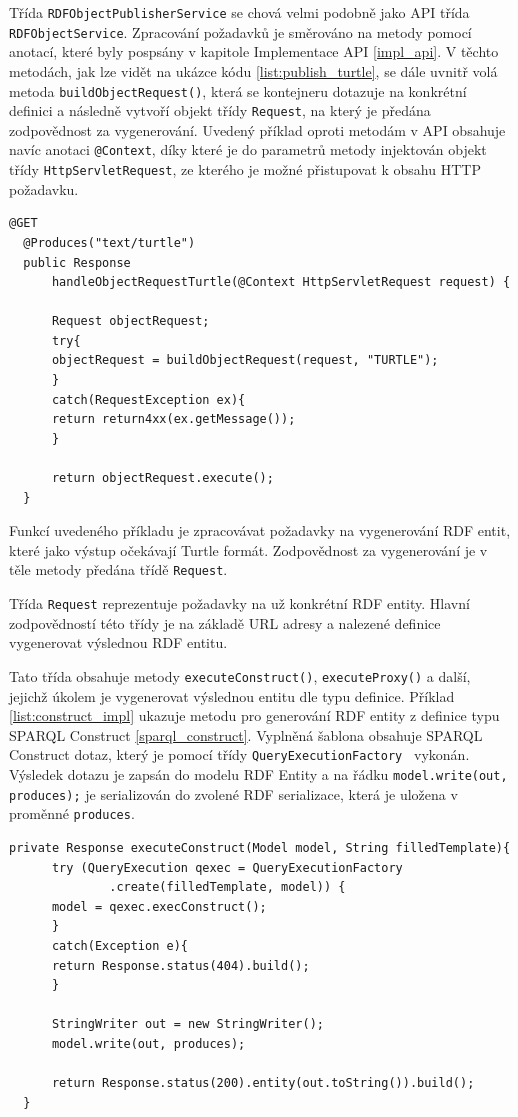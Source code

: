 \documentclass[thesis=B,czech]{FITthesis}[2012/06/26]
\begin{document}
  Třída \texttt{RDFObjectPublisherService} se chová velmi podobně jako API třída \texttt{RDFObjectService}.
  Zpracování požadavků je směrováno na metody pomocí anotací, které byly pospsány v kapitole Implementace API \ref{impl_api}.
  V těchto metodách, jak lze vidět na ukázce kódu \ref{list:publish_turtle}, se dále uvnitř volá metoda \texttt{buildObjectRequest()}, která se kontejneru dotazuje na konkrétní definici
  a následně vytvoří objekt třídy \texttt{Request}, na který je předána zodpovědnost za vygenerování. Uvedený příklad oproti metodám v API obsahuje navíc anotaci
  \texttt{@Context}, díky které je do parametrů metody injektován objekt třídy \texttt{HttpServletRequest}, ze kterého je možné přistupovat k obsahu HTTP požadavku.
  
  \begin{lstlisting}[float=htb,caption={Metoda pro zpracování požadavku klienta na vygenerování RDF entity v Turtle formátu},label=list:publish_turtle]
  @GET
  @Produces("text/turtle")
  public Response 
      handleObjectRequestTurtle(@Context HttpServletRequest request) {

      Request objectRequest;
      try{
	  objectRequest = buildObjectRequest(request, "TURTLE");
      }
      catch(RequestException ex){
	  return return4xx(ex.getMessage());
      }

      return objectRequest.execute();
  }
\end{lstlisting}
Funkcí uvedeného příkladu je zpracovávat požadavky na vygenerování RDF entit, které jako výstup očekávají Turtle formát. Zodpovědnost za vygenerování
je v těle metody předána třídě \texttt{Request}.
\newpage

Třída \texttt{Request} reprezentuje požadavky na už konkrétní RDF entity. Hlavní zodpovědností této třídy je na základě URL adresy a nalezené definice
vygenerovat výslednou RDF entitu. 

Tato třída obsahuje metody \texttt{executeConstruct()}, \texttt{executeProxy()} a další, jejichž úkolem je vygenerovat
výslednou entitu dle typu definice. Příklad \ref{list:construct_impl} ukazuje metodu pro generování RDF entity z definice typu SPARQL Construct \ref{sparql_construct}.
Vyplněná šablona obsahuje SPARQL Construct dotaz, který je pomocí třídy \texttt{QueryExecutionFactory	} vykonán. Výsledek dotazu je zapsán do modelu RDF Entity a na řádku 
\texttt{model.write(out, produces);} je serializován do zvolené RDF serializace, která je uložena v proměnné \texttt{produces}.

  \begin{lstlisting}[float=htb,caption={Metoda pro generování entit ze SPARQL Construct definicí},label=list:construct_impl]
private Response executeConstruct(Model model, String filledTemplate){
      try (QueryExecution qexec = QueryExecutionFactory
		      .create(filledTemplate, model)) {
	  model = qexec.execConstruct();
      }
      catch(Exception e){
	  return Response.status(404).build();
      }

      StringWriter out = new StringWriter();
      model.write(out, produces);

      return Response.status(200).entity(out.toString()).build();
  }
\end{lstlisting}
  
\end{document}
